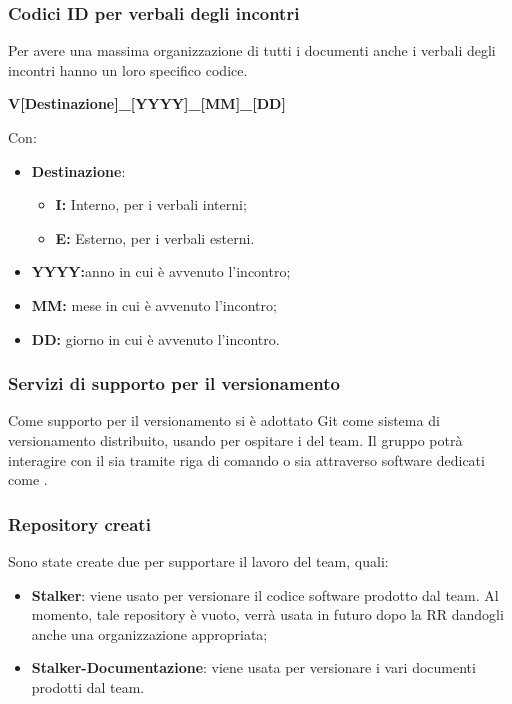 \subsubsection{Codici ID per verbali degli incontri}
Per avere una massima organizzazione di tutti i documenti anche i verbali degli incontri hanno un loro specifico codice.
\begin{center}
	\textbf{V[Destinazione]\_[YYYY]\_[MM]\_[DD]}
\end{center}
Con:
\begin{itemize}
\item \textbf{Destinazione}:
	\begin{itemize}
		\item \textbf{I:} Interno, per i verbali interni;
		\item \textbf{E:} Esterno, per i verbali esterni.
	\end{itemize}	
\item \textbf{YYYY:}anno in cui è avvenuto l’incontro;
\item \textbf{MM:} mese in cui è avvenuto l’incontro;
\item \textbf{DD:} giorno in cui è avvenuto l’incontro.
	
\end{itemize}

\subsubsection{Servizi di supporto per il versionamento} 
Come supporto per il versionamento si è adottato Git come sistema di versionamento distribuito, usando  per ospitare i  del team. Il gruppo potrà interagire con il  sia tramite riga di comando o sia attraverso software dedicati come .

\subsubsection{Repository creati}
Sono state create due  per supportare il lavoro del team, quali:
\begin{itemize}
\item \textbf{Stalker}: viene usato per versionare il codice software prodotto dal team. Al momento, tale repository è vuoto, verrà usata in futuro dopo la RR dandogli anche una organizzazione appropriata;
\item \textbf{Stalker-Documentazione}: viene usata per versionare i vari documenti prodotti dal team.
\end{itemize}

